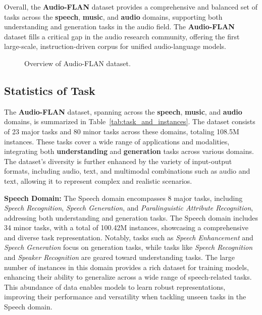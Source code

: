Overall, the \textbf{Audio-FLAN} dataset provides a comprehensive and balanced set of tasks across the \textbf{speech}, \textbf{music}, and \textbf{audio} domains, supporting both understanding and generation tasks in the audio field. The \textbf{Audio-FLAN} dataset fills a critical gap in the audio research community, offering the first large-scale, instruction-driven corpus for unified audio-language models. 

\begin{figure*}[h] %
\centering
{}
\caption{Overview of Audio-FLAN dataset.}
\label{fig:dataset_overview}
\end{figure*}



\subsection{Statistics of Task}
The \textbf{Audio-FLAN} dataset, spanning across the \textbf{speech}, \textbf{music}, and \textbf{audio} domains, is summarized in Table~\ref{tab:task_and_instances}. The dataset consists of 23 major tasks and 80 minor tasks across these domains, totaling 108.5M instances. These tasks cover a wide range of applications and modalities, integrating both \textbf{understanding} and \textbf{generation} tasks across various domains. The dataset’s diversity is further enhanced by the variety of input-output formats, including audio, text, and multimodal combinations such as audio and text, allowing it to represent complex and realistic scenarios.



\textbf{Speech Domain:} The Speech domain encompasses 8 major tasks, including \textit{Speech Recognition}, \textit{Speech Generation}, and \textit{Paralinguistic Attribute Recognition}, addressing both understanding and generation tasks. The Speech domain includes 34 minor tasks, with a total of 100.42M instances, showcasing a comprehensive and diverse task representation. Notably, tasks such as \textit{Speech Enhancement} and \textit{Speech Generation} focus on generation tasks, while tasks like \textit{Speech Recognition} and \textit{Speaker Recognition} are geared toward understanding tasks. The large number of instances in this domain provides a rich dataset for training models, enhancing their ability to generalize across a wide range of speech-related tasks. This abundance of data enables models to learn robust representations, improving their performance and versatility when tackling unseen tasks in the Speech domain.

